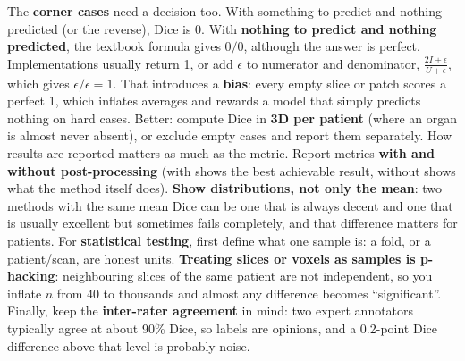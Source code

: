 \documentclass[a4paper]{article}
\newcommand{\K}[1]{\textcolor{kg}{\textbf{#1}}}
\newcommand{\F}[1]{\textcolor{fb}{#1}}
\newcommand{\E}[1]{\textcolor{ep}{#1}}
\newcommand{\T}[1]{\textcolor{tr}{\textbf{#1}}}
\begin{document}
The \K{corner cases} need a decision too. With something to predict and nothing predicted (or the reverse), Dice is 0. With \T{nothing to predict and nothing predicted}, the textbook formula gives \T{$0/0$}, although the answer is perfect. Implementations usually return 1, or add $\epsilon$ to numerator and denominator, \F{$\frac{2I+\epsilon}{U+\epsilon}$}, which gives $\epsilon/\epsilon=1$. That introduces a \T{bias}: every empty slice or patch scores a perfect 1, which inflates averages and rewards a model that simply predicts nothing on hard cases. Better: compute Dice in \K{3D per patient} (where an organ is almost never absent), or exclude empty cases and report them separately.
How results are reported matters as much as the metric. Report metrics \K{with and without post-processing} (with shows the best achievable result, without shows what the method itself does). \K{Show distributions, not only the mean}: two methods with the same mean Dice can be one that is always decent and one that is usually excellent but sometimes fails completely, and that difference matters for patients. For \K{statistical testing}, first define what one sample is: a fold, or a patient/scan, are honest units. \T{Treating slices or voxels as samples is p-hacking}: neighbouring slices of the same patient are not independent, so you inflate $n$ from 40 to thousands and almost any difference becomes ``significant''. Finally, keep the \K{inter-rater agreement} in mind: two expert annotators typically agree at about \E{90\% Dice}, so labels are opinions, and a 0.2-point Dice difference above that level is probably noise.
\end{document}
